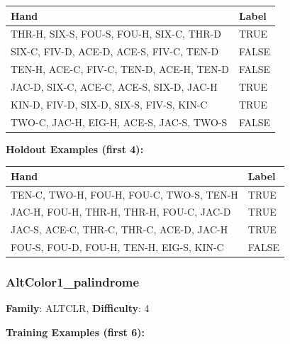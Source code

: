 \documentclass[10pt,a4paper]{article}
\begin{document}
\begin{small}
\begin{tabular}{p{8cm}l}
\toprule
Hand & Label \\
\midrule
THR-H, SIX-S, FOU-S, FOU-H, SIX-C, THR-D & \textcolor{positive}{TRUE} \\
SIX-C, FIV-D, ACE-D, ACE-S, FIV-C, TEN-D & \textcolor{negative}{FALSE} \\
TEN-H, ACE-C, FIV-C, TEN-D, ACE-H, TEN-D & \textcolor{negative}{FALSE} \\
JAC-D, SIX-C, ACE-C, ACE-S, SIX-D, JAC-H & \textcolor{positive}{TRUE} \\
KIN-D, FIV-D, SIX-D, SIX-S, FIV-S, KIN-C & \textcolor{positive}{TRUE} \\
TWO-C, JAC-H, EIG-H, ACE-S, JAC-S, TWO-S & \textcolor{negative}{FALSE} \\
\bottomrule
\end{tabular}
\end{small}

\textbf{Holdout Examples (first 4):}

\begin{small}
\begin{tabular}{p{8cm}l}
\toprule
Hand & Label \\
\midrule
TEN-C, TWO-H, FOU-H, FOU-C, TWO-S, TEN-H & \textcolor{positive}{TRUE} \\
JAC-H, FOU-H, THR-H, THR-H, FOU-C, JAC-D & \textcolor{positive}{TRUE} \\
JAC-S, ACE-C, THR-C, THR-C, ACE-D, JAC-H & \textcolor{positive}{TRUE} \\
FOU-S, FOU-D, FOU-H, TEN-H, EIG-S, KIN-C & \textcolor{negative}{FALSE} \\
\bottomrule
\end{tabular}
\end{small}

\vspace{0.5cm}

\subsubsection{AltColor1\_palindrome}

\textbf{Family}: ALTCLR, \textbf{Difficulty}: 4

\textbf{Training Examples (first 6):}
\end{document}
